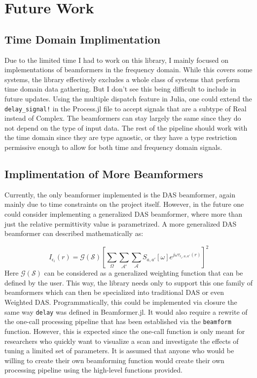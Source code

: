 \setcounter{chapter}{4}
\setcounter{section}{0}
\setcounter{subsection}{0}
\chapter*{Future Work}
\section{Time Domain Implimentation}
Due to the limited time I had to work on this library, I mainly focused on implementations of beamformers in the
frequency domain. While this covers some systems, the library effectively excludes a whole class of systems that perform
time domain data gathering. But I don't see this being difficult to include in future updates. Using the multiple
dispatch feature in Julia, one could extend the \lstinline[language=Julia]{delay_signal!} in the Process.jl file to
accept signals that are a subtype of Real instead of Complex. The beamformers can stay largely the same since they do
not depend on the type of input data. The rest of the pipeline should work with the time domain since they are type
agnostic, or they have a type restriction permissive enough to allow for both time and frequency domain signals.

\section{Implimentation of More Beamformers}
Currently, the only beamformer implemented is the DAS beamformer, again mainly due to time constraints on the project
itself. However, in the future one could consider implementing a generalized DAS beamformer, where more than just the
relative permittivity value is parametrized. A more generalized DAS beamformer can described mathematically as:

\begingroup
\large
\begin{equation}
    I_{\epsilon_i}(r) = \mathcal{G}(\mathcal{S}) \left [\sum_{\Omega}\sum_{\mathcal{A}'}\sum_{\mathcal{A}} S_{a, a'}[\omega]e^{j\omega \tau_{\epsilon_i, a, a'}(r)}\right ]^2
    \label{eq:GeneralisedDASBeamformer}
\end{equation}
\endgroup
Here $\mathcal{G}(\mathcal{S})$ can be considered as a generalized weighting function that can be defined by the user. This way, the
library needs only to support this one family of beamformers which can then be specialized into traditional DAS or even
Weighted DAS. Programmatically, this could be implemented via closure the same way \lstinline[language=Julia]{delay} was
defined in Beamformer.jl. It would also require a rewrite of the one-call processing pipeline that has been established
via the \lstinline[language=Julia]{beamform} function. However, this is expected since the one-call function is only
meant for researchers who quickly want to visualize a scan and investigate the effects of tuning a limited set of
parameters. It is assumed that anyone who would be willing to create their own beamforming function would create their
own processing pipeline using the high-level functions provided. 

